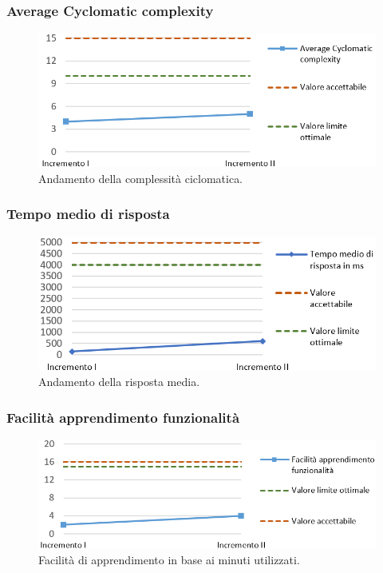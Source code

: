 \subsubsection{Average Cyclomatic complexity}
\begin{figure}[h]
	\centering
	\includegraphics[width=14cm]{Images/avComplex}
	\caption{Andamento della complessità ciclomatica.}
\end{figure}

\subsubsection{Tempo medio di risposta}
\begin{figure}[h]
	\centering
	\includegraphics[width=14cm]{Images/tRisp}
	\caption{Andamento della risposta media.}
\end{figure}

\newpage

\subsubsection{Facilità apprendimento funzionalità}
\begin{figure}[h]
	\centering
	\includegraphics[width=14cm]{Images/fAppr}
	\caption{Facilità di apprendimento in base ai minuti utilizzati.}
\end{figure}